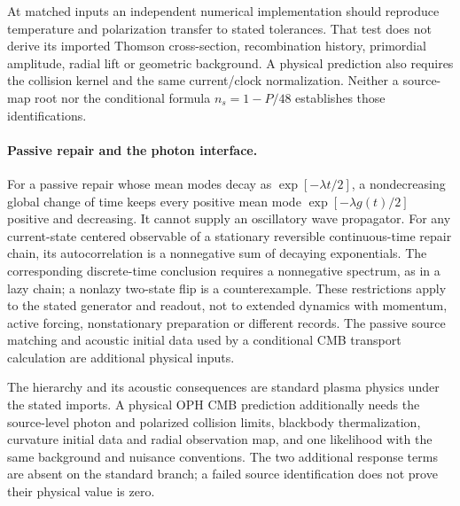 \documentclass[11pt]{article}
\theoremstyle{remark}
\begin{document}
At matched inputs an independent numerical implementation should reproduce
temperature and polarization transfer to stated tolerances. That test does
not derive its imported Thomson cross-section, recombination history, primordial
amplitude, radial lift or geometric background. A physical prediction also
requires the collision kernel and the same current/clock normalization.
Neither a source-map root nor the conditional formula \(n_s=1-P/48\)
establishes those identifications.

\paragraph{Passive repair and the photon interface.}
For a passive repair whose mean modes decay as \(\exp[-\lambda t/2]\), a
nondecreasing global change of time keeps every positive mean mode
\(\exp[-\lambda g(t)/2]\) positive and decreasing. It cannot supply an
oscillatory wave propagator. For any current-state centered observable of
a stationary reversible continuous-time repair chain, its autocorrelation
is a nonnegative sum of decaying exponentials. The corresponding
discrete-time conclusion requires a nonnegative spectrum, as in a lazy
chain; a nonlazy two-state flip is a counterexample. These restrictions
apply to the stated generator and readout, not to extended dynamics with
momentum, active forcing, nonstationary preparation or different records.
The passive source matching and acoustic initial data used by a conditional
CMB transport calculation are additional physical inputs.

The hierarchy and its acoustic consequences are standard plasma physics
under the stated imports. A physical OPH CMB prediction additionally needs
the source-level photon and polarized collision limits, blackbody
thermalization, curvature initial data and radial observation map, and one
likelihood with the same background and nuisance conventions. The two
additional response terms are absent on the standard branch; a failed
source identification does not prove their physical value is zero.
\end{document}

